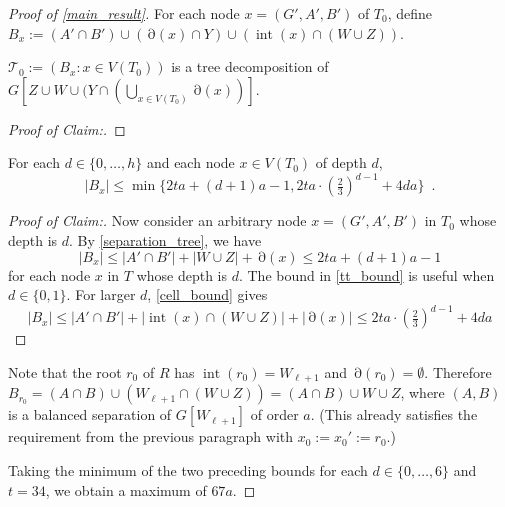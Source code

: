\documentclass{patmorin}
\newenvironment{clmproof}{\begin{proof}[Proof of Claim:]\renewcommand{\qedsymbol}{\rule{1ex}{1ex}}}{\end{proof}}
\DeclareMathOperator{\interior}{int}
\DeclareMathOperator{\boundary}{\partial}
\begin{document}
\begin{proof}[Proof of \cref{main_result}]
 For each node $x=(G',A',B')$ of $T_0$, define $B_x:=(A'\cap B')\cup(\boundary(x)\cap Y)\cup(\interior(x)\cap (W\cup Z))$.     

 \begin{clm}
    $\mathcal{T}_0:=(B_x:x\in V(T_0))$ is a tree decomposition of $G[Z\cup W\cup (Y\cap (\bigcup_{x\in V(T_0)}\boundary(x))]$.
 \end{clm}

 \begin{clmproof}
 \end{clmproof}
 
 \begin{clm}
    For each $d\in\{0,\ldots,h\}$ and each node $x\in V(T_0)$ of depth $d$,
    \[
      |B_x|\le \min\{2ta+(d+1)a -1, 2ta\cdot (\tfrac{2}{3})^{d-1} + 4da\} \enspace .
    \]         
 \end{clm}

  \begin{clmproof}
     Now consider an arbitrary node $x=(G',A',B')$ in $T_0$ whose depth is $d$.  By \cref{separation_tree}, we have 
 \begin{equation} 
   |B_x| \le |A'\cap B'| + |W\cup Z| + \boundary(x) \le 2ta + (d+1)a - 1 \label{tt_bound}
  \end{equation}
 for each node $x$ in $T$ whose depth is $d$. The bound in \eqref{tt_bound} is useful when $d\in\{0,1\}$. For larger $d$, \cref{cell_bound} gives
 \begin{equation} 
   |B_x| \le |A'\cap B'| + |\interior(x)\cap (W\cup Z)| + |\boundary(x)| \le 2ta\cdot (\tfrac{2}{3})^{d-1}+4da
  \end{equation}
  \end{clmproof}
  
 Note that the root $r_0$ of $R$ has $\interior(r_0)=W_{\ell+1}$ and $\boundary(r_0)=\emptyset$.  Therefore $B_{r_0}=(A\cap B)\cup (W_{\ell+1}\cap (W\cup Z))=(A\cap B)\cup W\cup Z$, where $(A,B)$ is a balanced separation of $G[W_{\ell+1}]$ of order $a$. (This already satisfies the requirement from the previous paragraph with $x_0:=x_0':=r_0$.)
 
 
 


  Taking the minimum of the two preceding bounds for each $d\in\{0,\ldots,6\}$ and $t=34$, we obtain a maximum of $67a$.
\end{proof}
 



\end{document}
